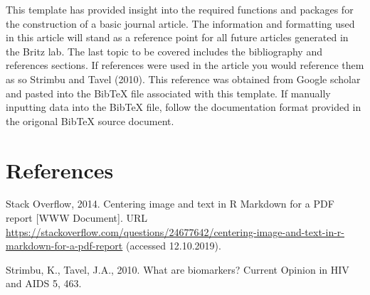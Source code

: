 \documentclass[]{elsarticle} %
\begin{document}
This template has provided insight into the required functions and
packages for the construction of a basic journal article. The
information and formatting used in this article will stand as a
reference point for all future articles generated in the Britz lab. The
last topic to be covered includes the bibliography and references
sections. If references were used in the article you would reference
them as so Strimbu and Tavel (2010). This reference was obtained from
Google scholar and pasted into the BibTeX file associated with this
template. If manually inputting data into the BibTeX file, follow the
documentation format provided in the origonal BibTeX source document.

\hypertarget{references}{%
\section*{References}\label{references}}

\hypertarget{refs}{}
\leavevmode\hypertarget{ref-Jonathan2014Stack}{}%
Stack Overflow, 2014. Centering image and text in R Markdown for a PDF
report {[}WWW Document{]}. URL
\url{https://stackoverflow.com/questions/24677642/centering-image-and-text-in-r-markdown-for-a-pdf-report}
(accessed 12.10.2019).

\leavevmode\hypertarget{ref-strimbu2010biomarkers}{}%
Strimbu, K., Tavel, J.A., 2010. What are biomarkers? Current Opinion in
HIV and AIDS 5, 463.
\end{document}
